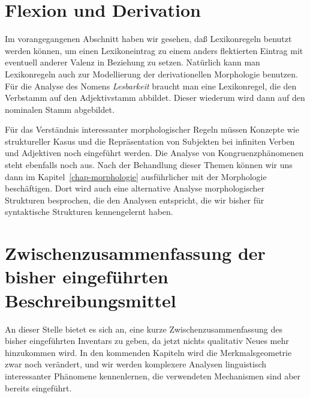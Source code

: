 \section{Flexion und Derivation}
\label{sec-lexikon-felx-deriv}

%
%
Im vorangegangenen Abschnitt haben wir gesehen, daß Lexikonregeln benutzt werden können, um einen
Lexikoneintrag zu einem anders flektierten Eintrag mit eventuell anderer Valenz in Beziehung zu setzen.
Natürlich kann man Lexikonregeln auch zur Modellierung der derivationellen Morphologie benutzen.
Für die Analyse des Nomens \emph{Lesbarkeit} braucht man eine Lexikonregel, die den Verbstamm
 auf den Adjektivstamm  abbildet. Dieser wiederum wird dann auf den nominalen
Stamm  abgebildet.

Für das Verständnis interessanter morphologischer Regeln müssen Konzepte wie struktureller Kasus
und die Repräsentation von Subjekten bei infiniten Verben und Adjektiven noch eingeführt werden.
Die Analyse von Kongruenzphänomenen steht ebenfalls noch aus. Nach der Behandlung dieser Themen
können wir uns dann im Kapitel~\ref{chap-morphologie} ausführlicher mit der Morphologie beschäftigen.
Dort wird auch eine alternative Analyse morphologischer Strukturen besprochen, die den Analysen
entspricht, die wir bisher für syntaktische Strukturen kennengelernt haben.%
%
%

\section{Zwischenzusammenfassung der bisher eingeführten Beschreibungsmittel}

An dieser Stelle bietet es sich an, eine kurze Zwischenzusammenfassung des bisher eingeführten
Inventars zu geben, da jetzt nichts qualitativ Neues mehr hinzukommen wird. In den kommenden
Kapiteln wird die Merkmalsgeometrie zwar noch verändert, und wir werden komplexere Analysen
linguistisch interessanter Phänomene kennenlernen, die verwendeten Mechanismen sind aber
bereits eingeführt. 


